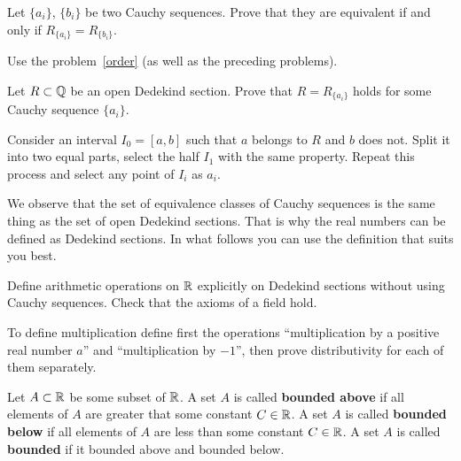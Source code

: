 \documentclass[12pt]{article}
\begin{document}
\begin{zadacha}[*] Let $\{ a_i\}$, $\{b_i\}$ be two Cauchy
  sequences. Prove that they are equivalent if and only if $R_{\{
  a_i\}} = R_{\{ b_i\}}$.
\end{zadacha}

\begin{ukazanie}
Use the problem~\ref{order} (as well as the preceding problems).
\end{ukazanie}

\begin{zadacha}[*]
Let $R \subset {\mathbb Q}$ be an open Dedekind section. Prove that $R
= R_{\{a_i\}}$ holds for some Cauchy sequence $\{a_i\}$.
\end{zadacha}

\begin{ukazanie}
Consider an interval $I_0=[a,b]$ such that $a$ belongs to $R$ and $b$
does not. Split it into two equal parts, select the half $I_1$ with
the same property. Repeat this process and select any point of $I_i$
as $a_i$.
\end{ukazanie} 

We observe that the set of equivalence classes of Cauchy sequences is
the same thing as the set of open Dedekind sections. That is why the
real numbers can be defined as Dedekind sections. In what follows you
can use the definition that suits you best.

\begin{zadacha}[**]
Define arithmetic operations on ${\mathbb R}$ explicitly on Dedekind sections
without using Cauchy sequences. Check that the axioms of a field hold.
\end{zadacha}

\begin{ukazanie}
To define multiplication define first the operations  ``multiplication
by a positive real number $a$'' and ``multiplication by $-1$'',
then prove distributivity for each of them separately.
\end{ukazanie}


\begin{opredelenie} Let $A\subset {\mathbb R}$ be some subset of
${\mathbb R}$. A set $A$ is called {\bf bounded above} if all elements of
$A$ are greater that some constant $C\in {\mathbb R}$.  A set $A$ is called
{\bf bounded below} if all elements of $A$ are less than some constant
$C\in {\mathbb R}$. A set $A$ is called {\bf bounded} if it bounded above and
bounded below.
\end{opredelenie}
\end{document}

